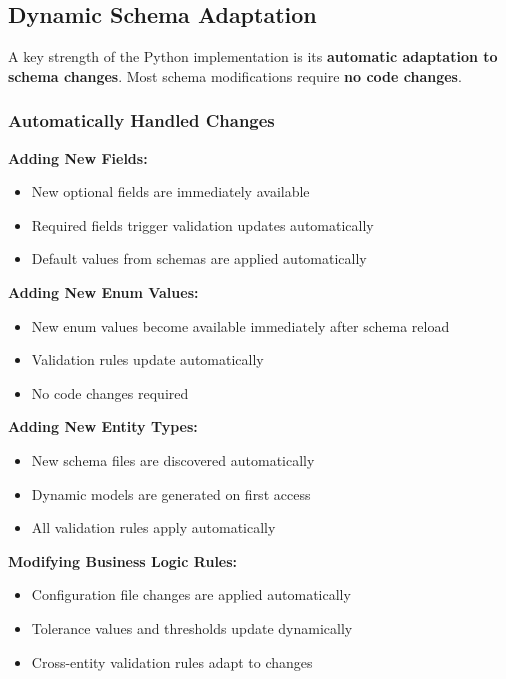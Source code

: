 \subsection{Dynamic Schema Adaptation}
\label{sec:python-schema-adaptation}

A key strength of the Python implementation is its \textbf{automatic adaptation to schema changes}. Most schema modifications require \textbf{no code changes}.

\subsubsection{Automatically Handled Changes}
\label{sec:python-auto-changes}

\textbf{Adding New Fields:}
\begin{itemize}
    \item New optional fields are immediately available
    \item Required fields trigger validation updates automatically
    \item Default values from schemas are applied automatically
\end{itemize}

\textbf{Adding New Enum Values:}
\begin{itemize}
    \item New enum values become available immediately after schema reload
    \item Validation rules update automatically
    \item No code changes required
\end{itemize}

\textbf{Adding New Entity Types:}
\begin{itemize}
    \item New schema files are discovered automatically
    \item Dynamic models are generated on first access
    \item All validation rules apply automatically
\end{itemize}

\textbf{Modifying Business Logic Rules:}
\begin{itemize}
    \item Configuration file changes are applied automatically
    \item Tolerance values and thresholds update dynamically
    \item Cross-entity validation rules adapt to changes
\end{itemize}

